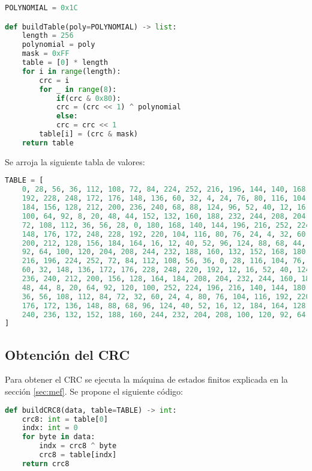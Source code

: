\documentclass[
12pt,
spanish,
singlespacing,
parskip,
headsepline]{article}
\begin{document}
\begin{lstlisting}[language=Python]
POLYNOMIAL = 0x1C

def buildTable(poly=POLYNOMIAL) -> list:
	length = 256
	polynomial = poly
	mask = 0xFF
	table = [0] * length
	for i in range(length):
		crc = i
		for _ in range(8):
			if(crc & 0x80):
			crc = (crc << 1) ^ polynomial
			else:
			crc = crc << 1
		table[i] = (crc & mask)
	return table
\end{lstlisting}

Se arroja la siguiente tabla de valores:

\begin{lstlisting}[language=Python]
TABLE = [
	0, 28, 56, 36, 112, 108, 72, 84, 224, 252, 216, 196, 144, 140, 168, 180, 220,
	192, 228, 248, 172, 176, 148, 136, 60, 32, 4, 24, 76, 80, 116, 104, 164,
	184, 156, 128, 212, 200, 236, 240, 68, 88, 124, 96, 52, 40, 12, 16, 120,
	100, 64, 92, 8, 20, 48, 44, 152, 132, 160, 188, 232, 244, 208, 204, 84,
	72, 108, 112, 36, 56, 28, 0, 180, 168, 140, 144, 196, 216, 252, 224, 136,
	148, 176, 172, 248, 228, 192, 220, 104, 116, 80, 76, 24, 4, 32, 60, 240, 236,
	200, 212, 128, 156, 184, 164, 16, 12, 40, 52, 96, 124, 88, 68, 44, 48, 20, 8,
	92, 64, 100, 120, 204, 208, 244, 232, 188, 160, 132, 152, 168, 180, 144, 140,
	216, 196, 224, 252, 72, 84, 112, 108, 56, 36, 0, 28, 116, 104, 76, 80, 4, 24,
	60, 32, 148, 136, 172, 176, 228, 248, 220, 192, 12, 16, 52, 40, 124, 96, 68, 88,
	236, 240, 212, 200, 156, 128, 164, 184, 208, 204, 232, 244, 160, 188, 152, 132,
	48, 44, 8, 20, 64, 92, 120, 100, 252, 224, 196, 216, 140, 144, 180, 168, 28, 0,
	36, 56, 108, 112, 84, 72, 32, 60, 24, 4, 80, 76, 104, 116, 192, 220, 248, 228,
	176, 172, 136, 148, 88, 68, 96, 124, 40, 52, 16, 12, 184, 164, 128, 156, 200, 212,
	240, 236, 132, 152, 188, 160, 244, 232, 204, 208, 100, 120, 92, 64, 20, 8, 44, 48
]
\end{lstlisting}

\subsection{Obtención del CRC}
\label{sub:obtencion}

Para obtener el CRC se ejecuta la máquina de estados finitos explicada en la sección \ref{sec:mef}.
Se propone el siguiente código:

\begin{lstlisting}[language=Python]
def buildCRC8(data, table=TABLE) -> int:
	crc8: int = table[0]
	indx: int = 0
	for byte in data:
		indx = crc8 ^ byte
		crc8 = table[indx]
	return crc8
\end{lstlisting}
\end{document}
